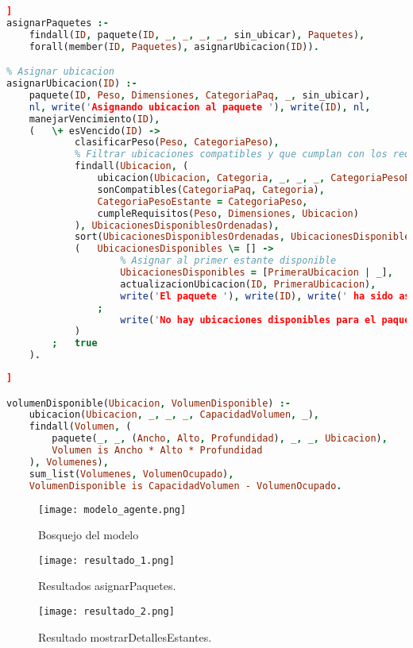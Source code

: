 \documentclass[12pt]{article}
\begin{document}
\begin{lstlisting}[language=Prolog, caption={ Asignar ubicación a los paquetes}, label={lst:asignarPaquetes}]]
asignarPaquetes :-
    findall(ID, paquete(ID, _, _, _, _, sin_ubicar), Paquetes),
    forall(member(ID, Paquetes), asignarUbicacion(ID)).

% Asignar ubicacion
asignarUbicacion(ID) :-
    paquete(ID, Peso, Dimensiones, CategoriaPaq, _, sin_ubicar),
    nl, write('Asignando ubicacion al paquete '), write(ID), nl,
    manejarVencimiento(ID),
    (   \+ esVencido(ID) ->
            clasificarPeso(Peso, CategoriaPeso),
            % Filtrar ubicaciones compatibles y que cumplan con los requisitos
            findall(Ubicacion, (
                ubicacion(Ubicacion, Categoria, _, _, _, CategoriaPesoEstante),
                sonCompatibles(CategoriaPaq, Categoria),
                CategoriaPesoEstante = CategoriaPeso,
                cumpleRequisitos(Peso, Dimensiones, Ubicacion)
            ), UbicacionesDisponiblesOrdenadas),
            sort(UbicacionesDisponiblesOrdenadas, UbicacionesDisponibles),
            (   UbicacionesDisponibles \= [] ->
                    % Asignar al primer estante disponible
                    UbicacionesDisponibles = [PrimeraUbicacion | _],
                    actualizacionUbicacion(ID, PrimeraUbicacion),
                    write('El paquete '), write(ID), write(' ha sido asignado a la ubicacion '), write(PrimeraUbicacion), nl
                ;
                    write('No hay ubicaciones disponibles para el paquete '), write(ID), nl
            )
        ;   true
    ).


\end{lstlisting}
\begin{lstlisting}[language=Prolog, caption={ Verificar si hay suficiente volumen disponible en una ubicación}, label={lst:volumenDisponible}]]

volumenDisponible(Ubicacion, VolumenDisponible) :-
    ubicacion(Ubicacion, _, _, _, CapacidadVolumen, _),
    findall(Volumen, (
        paquete(_, _, (Ancho, Alto, Profundidad), _, _, Ubicacion), 
        Volumen is Ancho * Alto * Profundidad
    ), Volumenes),
    sum_list(Volumenes, VolumenOcupado),
    VolumenDisponible is CapacidadVolumen - VolumenOcupado.

\end{lstlisting}

\begin{figure}[h]
    \centering
    \texttt{[image: modelo\_agente.png]}
    \caption{Bosquejo del modelo}
    \label{fig:modelo_1}
\end{figure}

\begin{figure}[h]
    \centering
    \texttt{[image: resultado\_1.png]}
    \caption{Resultados asignarPaquetes.}
    \label{fig:asignarPaquetes}
\end{figure}
\begin{figure}[h]
    \centering
    \texttt{[image: resultado\_2.png]}
    \caption{Resultado mostrarDetallesEstantes.}
    \label{fig:detallesEstantes}
\end{figure}
\end{document}
